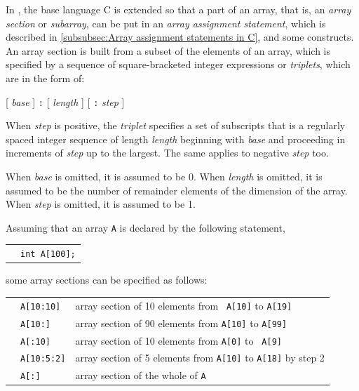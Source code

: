In {\XMPC}, the base language C is extended so that a part of an array,
that is, an {\it array section} or {\it subarray}, can be put in an {\it
array assignment statement}, which is described in \ref{subsubsec:Array
assignment statements in C}, and some {\XMP} constructs.
%
An array section is built from a subset of the elements of an array,
which is specified by a sequence of square-bracketed integer expressions
or {\it triplets}, which are in the form of:

\begin{center}
  [ {\it base} ] {\tt :} [ {\it length} ] [ {\tt :} {\it step} ]
\end{center}

When {\it step} is positive, the {\it triplet} specifies a set of
subscripts that is a regularly spaced integer sequence of length {\it
length} beginning with {\it base} and proceeding in increments of {\it
step} up to the largest.
%
The same applies to negative {\it step} too.

When {\it base} is omitted, it is assumed to be 0. When {\it length}
is omitted, it is assumed to be the number of remainder elements of the
dimension of the array. When {\it step} is omitted, it is assumed to be 1.


Assuming that an array {\tt A} is declared by the following statement,

\vspace{0.3cm}

\begin{tabular}{ll}
\hspace{0.5cm} & {\tt int A[100];} \\
\end{tabular}

\vspace{0.3cm}

\noindent some array sections can be specified as follows:

\vspace{0.3cm}

\begin{tabular}{lll}
\hspace{0.5cm} & {\tt A[10:10]} & array section of 10 elements from {\tt
 A[10]} to {\tt A[19]} \\
 & {\tt A[10:]} & array section of 90 elements from
		  {\tt A[10]} to {\tt A[99]}\\
 & {\tt A[:10]} & array section of 10 elements from {\tt A[0]} to {\tt
	 A[9]} \\
 & {\tt A[10:5:2]} & array section of 5 elements from {\tt A[10]} to
	 {\tt A[18]} by step 2 \\
 & {\tt A[:]}      & array section of the whole of {\tt A} \\
\end{tabular}


